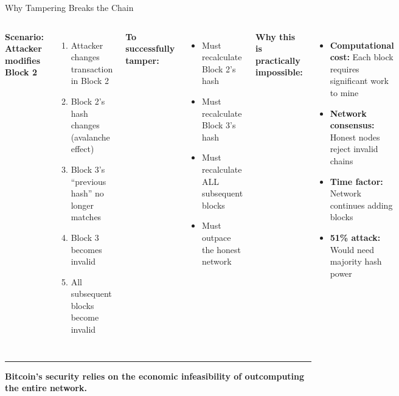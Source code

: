 \documentclass[8pt,aspectratio=169]{beamer}
\newcommand{\bottomnote}[1]{%
\vfill
\vspace{-2mm}
\textcolor{mllavender2}{\rule{\textwidth}{0.4pt}}
\vspace{1mm}
\footnotesize
\textbf{#1}
}
\begin{document}
\begin{frame}[t]{Why Tampering Breaks the Chain}
\begin{columns}[T]
\textbf{Scenario: Attacker modifies Block 2}

\vspace{0.5em}
\begin{enumerate}
\item Attacker changes transaction in Block 2
\item Block 2's hash changes (avalanche effect)
\item Block 3's ``previous hash'' no longer matches
\item Block 3 becomes invalid
\item All subsequent blocks become invalid
\end{enumerate}

\vspace{0.5em}
\textbf{To successfully tamper:}
\begin{itemize}
\item Must recalculate Block 2's hash
\item Must recalculate Block 3's hash
\item Must recalculate ALL subsequent blocks
\item Must outpace the honest network
\end{itemize}

\textbf{Why this is practically impossible:}

\vspace{0.5em}
\begin{itemize}
\item \textbf{Computational cost:} Each block requires significant work to mine
\item \textbf{Network consensus:} Honest nodes reject invalid chains
\item \textbf{Time factor:} Network continues adding blocks
\item \textbf{51\% attack:} Would need majority hash power
\end{itemize}

\vspace{1em}
\begin{center}
\end{center}
\end{columns}

\bottomnote{Bitcoin's security relies on the economic infeasibility of outcomputing the entire network.}
\end{frame}
\end{document}
